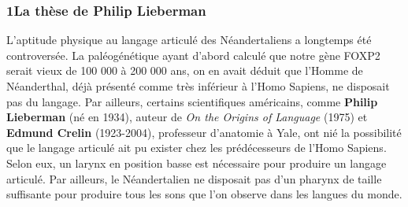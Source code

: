 \subsubsection*{1\quad La thèse de Philip Lieberman}
L’aptitude physique au langage articulé des Néandertaliens a longtemps été controversée. La paléogénétique ayant d’abord calculé que notre gène FOXP2 serait vieux de 100 000 à 200 000 ans, on en avait déduit que l’Homme de Néanderthal, déjà présenté comme très inférieur à l’Homo Sapiens, ne disposait pas du langage. Par ailleurs, certains scientifiques américains, comme \textbf{Philip Lieberman} (né en 1934), auteur de \textit{On the Origins of Language} (1975) et \textbf{Edmund Crelin} (1923-2004), professeur d’anatomie à Yale, ont nié la possibilité que le langage articulé ait pu exister chez les prédécesseurs de l’Homo Sapiens. Selon eux, un larynx en position basse est nécessaire pour produire un langage articulé. Par ailleurs, le Néandertalien ne disposait pas d’un pharynx de taille suffisante pour produire tous les sons que l’on observe dans les langues du monde.
